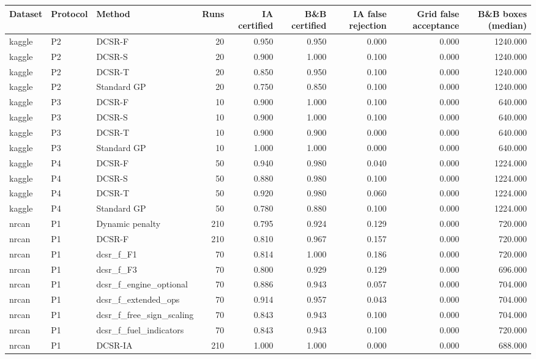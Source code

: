 \begin{tabular}{lllrrrrrr}
\toprule
Dataset & Protocol & Method & Runs & IA certified & B\&B certified & IA false rejection & Grid false acceptance & B\&B boxes (median) \\
\midrule
kaggle & P2 & DCSR-F & 20 & 0.950 & 0.950 & 0.000 & 0.000 & 1240.000 \\
kaggle & P2 & DCSR-S & 20 & 0.900 & 1.000 & 0.100 & 0.000 & 1240.000 \\
kaggle & P2 & DCSR-T & 20 & 0.850 & 0.950 & 0.100 & 0.000 & 1240.000 \\
kaggle & P2 & Standard GP & 20 & 0.750 & 0.850 & 0.100 & 0.000 & 1240.000 \\
kaggle & P3 & DCSR-F & 10 & 0.900 & 1.000 & 0.100 & 0.000 & 640.000 \\
kaggle & P3 & DCSR-S & 10 & 0.900 & 1.000 & 0.100 & 0.000 & 640.000 \\
kaggle & P3 & DCSR-T & 10 & 0.900 & 0.900 & 0.000 & 0.000 & 640.000 \\
kaggle & P3 & Standard GP & 10 & 1.000 & 1.000 & 0.000 & 0.000 & 640.000 \\
kaggle & P4 & DCSR-F & 50 & 0.940 & 0.980 & 0.040 & 0.000 & 1224.000 \\
kaggle & P4 & DCSR-S & 50 & 0.880 & 0.980 & 0.100 & 0.000 & 1224.000 \\
kaggle & P4 & DCSR-T & 50 & 0.920 & 0.980 & 0.060 & 0.000 & 1224.000 \\
kaggle & P4 & Standard GP & 50 & 0.780 & 0.880 & 0.100 & 0.000 & 1224.000 \\
nrcan & P1 & Dynamic penalty & 210 & 0.795 & 0.924 & 0.129 & 0.000 & 720.000 \\
nrcan & P1 & DCSR-F & 210 & 0.810 & 0.967 & 0.157 & 0.000 & 720.000 \\
nrcan & P1 & dcsr\_f\_F1 & 70 & 0.814 & 1.000 & 0.186 & 0.000 & 720.000 \\
nrcan & P1 & dcsr\_f\_F3 & 70 & 0.800 & 0.929 & 0.129 & 0.000 & 696.000 \\
nrcan & P1 & dcsr\_f\_engine\_optional & 70 & 0.886 & 0.943 & 0.057 & 0.000 & 704.000 \\
nrcan & P1 & dcsr\_f\_extended\_ops & 70 & 0.914 & 0.957 & 0.043 & 0.000 & 704.000 \\
nrcan & P1 & dcsr\_f\_free\_sign\_scaling & 70 & 0.843 & 0.943 & 0.100 & 0.000 & 704.000 \\
nrcan & P1 & dcsr\_f\_fuel\_indicators & 70 & 0.843 & 0.943 & 0.100 & 0.000 & 720.000 \\
nrcan & P1 & DCSR-IA & 210 & 1.000 & 1.000 & 0.000 & 0.000 & 688.000 \\

\end{tabular}
